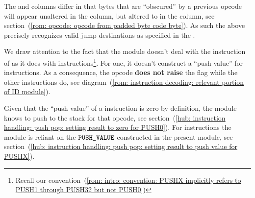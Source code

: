\saNote{}
The \romColumnOpcode{} and \romColumnLimbByte{} columns differ in that bytes that are ``obscured'' by a previous  opcode
will appear unaltered in the \romColumnLimbByte{} column, but altered to  in the \romColumnOpcode{} column, see section~(\ref{rom: opcode: opcode from padded byte code byte}).
As such the above precisely recognizes valid jump destinations as specified in the \cite{EYP-London}.

\saNote{}
\label{rom: columns: IS_PUSH_FLAG does not light up for PUSH0}
We draw attention to the fact that the \romMod{} module
doesn't deal with the  instruction of \cite{EIP-3855} as it does with
 instructions\footnote{Recall our convention~(\ref{rom: intro: convention: PUSHX implicitly refers to PUSH1 through PUSH32 but not PUSH0})}.
For one, it doesn't construct a ``push value'' for  instructions.
As a consequence, the  opcode \textbf{does not raise} the \romColumnOpcodeIsPush{} flag while the other  instructions do,
see diagram~(\ref{rom: instruction decoding: relevant portion of ID module}).

\saNote{}
\label{rom: columns: push values for PUSH0 vs PUSHX in the HUB}
Given that the ``push value'' of a  instruction is zero by definition,
the \hubMod{} module knows to push  to the stack for that opcode,
see section~(\ref{hub: instruction handling: push pop: setting result to zero for PUSH0}).
For  instructions the \hubMod{} module is reliant on the $\texttt{PUSH\_VALUE}$ constructed in the present module,
see section~(\ref{hub: instruction handling: push pop: setting result to push value for PUSHX}).
